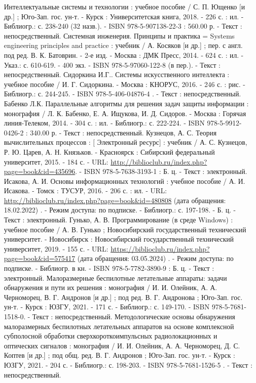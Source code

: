 \begin{thebibliography}{50}
     Интеллектуальные системы и технологии : учебное пособие / С. П. Ющенко [и др.] ; Юго-Зап. гос. ун-т. - Курск : Университетская книга, 2018. - 226 с. : ил. - Библиогр.: с. 238-240 (32 назв.). - ISBN 978-5-907138-22-3 : 560.00 р. - Текст : непосредственный.
    \bibitem{} Системная инженерия. Принципы и практика = Systems engineering principles and practice : учебник / А. Косяков [и др.] ; пер. с англ. под ред. В. К. Батоврин. - 2-е изд. - Москва : ДМК Пресс, 2014. - 624 с. : ил. - Указ.: с. 610-619. - 400 экз. - ISBN 978-5-97060-122-8 (в пер.). - Текст : непосредственный.
    \bibitem{} Сидоркина И.Г..   Системы искусственного интеллекта : учебное пособие / И. Г. Сидоркина. - Москва : КНОРУС, 2016. - 246 с. : рис. - Библиогр.: с. 244-245. - ISBN 978-5-406-04876-4 . - Текст : непосредственный.
    \bibitem{} Бабенко Л.К.   Параллельные алгоритмы для решения задач защиты информации : монография / Л. К. Бабенко, Е. А. Ищукова, И. Д. Сидоров. - Москва : Горячая линия-Телеком, 2014. - 304 с. : ил. - Библиогр.: с. 222-224. - ISBN 978-5-9912-0426-2 : 340.00 р. - Текст : непосредственный.
    \bibitem{} Кузнецов, А. С.    Теория вычислительных процессов : [ Электронный ресурс] : учебник / А. С. Кузнецов, Р. Ю. Царев, А. Н. Князьков. - Красноярск : Сибирский федеральный университет, 2015. - 184 с. - URL: \url{http://biblioclub.ru/index.php?page=book&id=435696}. - ISBN 978-5-7638-3193-1 : Б. ц.  - Текст : электронный.
    \bibitem{} Исакова, А. И.    Основы информационных технологий : учебное пособие / А. И. Исакова. - Томск : ТУСУР, 2016. - 206 с. : ил. - URL: \url{http://biblioclub.ru/index.php?page=book&id=480808} (дата обращения: 18.02.2022) . - Режим доступа: по подписке. - Библиогр.: с. 197-198. - Б. ц. - Текст : электронный.
    \bibitem{} Гунько, А. В.    Программирование (в среде Windows) : учебное пособие / А. В. Гунько ; Новосибирский государственный технический университет. - Новосибирск : Новосибирский государственный технический университет, 2019. - 155 с. - URL: \url{https://biblioclub.ru/index.php?page=book&id=575417} (дата обращения: 03.05.2024) . - Режим доступа: по подписке. - Библиогр. в кн. - ISBN 978-5-7782-3890-9 : Б. ц. - Текст : электронный.
    \bibitem{} Малоразмерные беспилотные летательные аппараты: задачи обнаружения и пути их решения : монография / И. И. Олейник, А. А. Черноморец, В. Г. Андронов [и др.] ; под ред. В. Г. Андронова ; Юго-Зап. гос. ун-т. - Курск : ЮЗГУ, 2021. - 171 с. - Библиогр.: с. 149-170. - ISBN 978-5-7681-1518-0. - Текст : непосредственный.
    \bibitem{} Методологические основы обнаружения малоразмерных беспилотных летательных аппаратов на основе комплексной субполосной обработки сверхкороткоимпульсных радиолокационных и оптических сигналов : монография / И. И. Олейник, А. А. Черноморец, Д. С. Коптев [и др.] ; под общ. ред. В. Г. Андронов ; Юго-Зап. гос. ун-т. - Курск : ЮЗГУ, 2021. - 204 с. - Библиогр.: с. 198-203. - ISBN 978-5-7681-1526-5 . - Текст : непосредственный.

\end{thebibliography}
